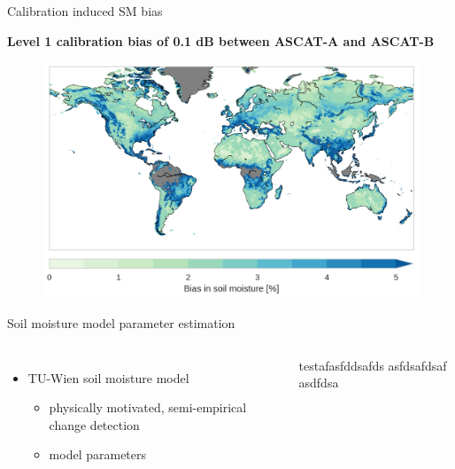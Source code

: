 \documentclass[10pt,ignorenonframetext,xcolor={dvipsnames, table}]{beamer}
\providecommand{\tightlist}{%
\setlength{\itemsep}{0pt}\setlength{\parskip}{0pt}}
\begin{document}
\begin{frame}{Calibration induced SM bias}

\begin{center}
\textbf{Level 1 calibration bias of 0.1 dB between ASCAT-A and ASCAT-B}
\end{center}

\begin{figure}
\includegraphics[width=.9\textwidth]{./figures/metop_b_ssm_cal_bias.png}
\end{figure}

\end{frame}

\begin{frame}{Soil moisture model parameter estimation}

\begin{columns}


\begin{itemize}
\tightlist
\item
  TU-Wien soil moisture model

  \begin{itemize}
  \tightlist
  \item
    physically motivated, semi-empirical change detection
  \item
    model parameters
  \end{itemize}
\end{itemize}


testafasfddsafds asfdsafdsaf asdfdsa

\end{columns}

\end{frame}
\end{document}
